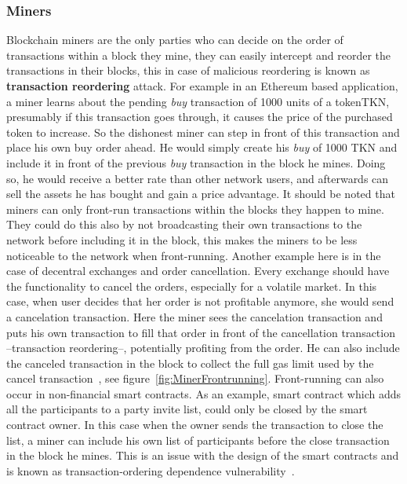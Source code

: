 \subsubsection{Miners} \label{minersfrontrunning}
Blockchain miners are the only parties who can decide on the order of transactions within a block they mine, they can easily intercept and reorder the transactions in their blocks, this in case of malicious reordering is known as \textbf{transaction reordering} attack. For example in an Ethereum based application, a miner learns about the pending \textit{buy} transaction of 1000 units of a token\ie TKN, presumably if this transaction goes through, it causes the price of the purchased token to increase. So the dishonest miner can step in front of this transaction and place his own buy order ahead. He would simply create his \textit{buy} of 1000 TKN and include it in front of the previous \textit{buy} transaction in the block he mines. Doing so, he would receive a better rate than other network users, and afterwards can sell the assets he has bought and gain a price advantage. It should be noted that miners can only front-run transactions within the blocks they happen to mine. They could do this also by not broadcasting their own transactions to the network before including it in the block, this makes the miners to be less noticeable to the network when front-running.
Another example here is in the case of decentral exchanges and order cancellation. Every exchange should have the functionality to cancel the orders, especially for a volatile market. In this case, when user decides that her order is not profitable anymore, she would send a cancelation transaction. Here the miner sees the cancelation transaction and puts his own transaction to fill that order in front of the cancellation transaction --transaction reordering--, potentially profiting from the order. He can also include the canceled transaction in the block to collect the full gas limit used by the cancel transaction~\cite{CostofDecentralization:online}, see figure~\ref{fig:MinerFrontrunning}. Front-running can also occur in non-financial smart contracts. As an example, smart contract which adds all the participants to a party invite list, could only be closed by the smart contract owner. In this case when the owner sends the transaction to close the list, a miner can include his own list of participants before the close transaction in the block he mines. This is an issue with the design of the smart contracts and is known as transaction-ordering dependence vulnerability~\cite{luu2016making}. 

